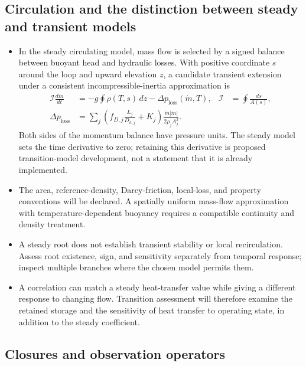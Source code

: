 \subsection{Circulation and the distinction between steady and transient models}\label{subsec:circulation-balance}
\begin{itemize}[leftmargin=*]
\item In the steady circulating model, mass flow is selected by a signed balance between buoyant head and hydraulic losses. With positive coordinate $s$ around the loop and upward elevation $z$, a candidate transient extension under a consistent incompressible-inertia approximation is
\begin{align}
\mathcal I\frac{d\dot m}{dt}&=-g\oint\rho(T,s)\,dz-\Delta p_{\mathrm{loss}}(\dot m,T),
&\mathcal I&=\oint\frac{ds}{A(s)},\label{eq:momentum-extension}\\
\Delta p_{\mathrm{loss}}&=\sum_j\left(f_{D,j}\frac{L_j}{D_{h,j}}+K_j\right)
\frac{\dot m|\dot m|}{2\rho_j A_j^2}.\label{eq:signed-loss}
\end{align}
Both sides of the momentum balance have pressure units. The steady model sets the time derivative to zero; retaining this derivative is proposed transition-model development, not a statement that it is already implemented.
\item The area, reference-density, Darcy-friction, local-loss, and property conventions will be declared. A spatially uniform mass-flow approximation with temperature-dependent buoyancy requires a compatible continuity and density treatment.\cite{borgohain2011naturalcirculation}
\item A steady root does not establish transient stability or local recirculation. Assess root existence, sign, and sensitivity separately from temporal response; inspect multiple branches where the chosen model permits them.
\item A correlation can match a steady heat-transfer value while giving a different response to changing flow. Transition assessment will therefore examine the retained storage and the sensitivity of heat transfer to operating state, in addition to the steady coefficient.\cite{cammi2016wallinertia}
\end{itemize}

\subsection{Closures and observation operators}\label{subsec:closures-and-observation-operators}

